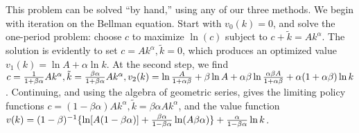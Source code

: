   This problem can be solved ``by hand,'' using any of our three methods.
We begin with iteration on the Bellman equation.
Start with $v_0(k) = 0$, and solve the one-period problem:
choose $c$ to maximize $\ln (c)$ subject to
$c + \tilde k = A k^\alpha.$  The solution
is evidently to set $c=Ak^\alpha, \tilde k=0$, which
produces an optimized value $v_1(k) = \ln A + \alpha \ln k$.
At the second step, we find $c= {1 \over 1 + \beta \alpha} A k^\alpha,
\tilde k = {\beta \alpha \over 1 + \beta \alpha}A k^\alpha,
v_2(k) = \ln {A \over 1 + \alpha \beta} + \beta \ln A
+ \alpha \beta \ln{\alpha \beta A \over 1 + \alpha \beta}
+ \alpha (1+\alpha \beta) \ln k$.  Continuing, and using
the algebra of geometric series, gives the
limiting policy functions $c=(1-\beta \alpha) A k^\alpha,
\tilde k = \beta \alpha  A k^\alpha$,
and the value function $v(k) = (1-\beta)^{-1}\{ \ln[A(1-\beta\alpha)]
+ {\beta \alpha \over 1-\beta \alpha} \ln(A\beta \alpha)\}
+ {\alpha \over 1-\beta\alpha} \ln k$.
\smallskip

